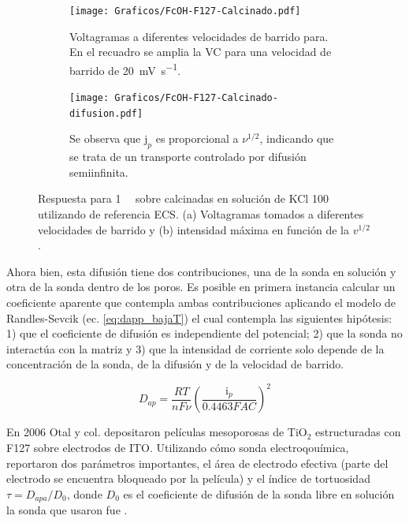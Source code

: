 	 	\begin{figure}[h!]
				 \begin{subfigure}[t]{0.5\textwidth}
		 	    \texttt{[image: Graficos/FcOH-F127-Calcinado.pdf]}
		        \caption[Voltagrama para \fc\space en \pdm\space calcinadas]{Voltagramas a diferentes velocidades de barrido para. En el recuadro se amplia la VC para una velocidad de barrido de \SI{20}{\milli\volt\per\second}.}
		        \label{fig:fc_calcinado}
		      	\end{subfigure}
		      	  \begin{subfigure}[t]{0.5\textwidth}
		 	    \texttt{[image: Graficos/FcOH-F127-Calcinado-difusion.pdf]}
		        \caption[i$_p$ en función de $\nu$ para \fc\space]{Se observa que $\text{j}_p$ es proporcional a $\nu ^{1/2}$, indicando que se trata de un transporte controlado por difusión semiinfinita.}
		        \label{fig:difusion_calcinado}
		      	\end{subfigure}
		      	\caption{Respuesta para \fc\space \SI{1}{\milli\Molar} sobre \pdmF\space calcinadas en solución de KCl \SI{100}{\milli\Molar} utilizando de referencia ECS. (a) Voltagramas tomados a diferentes velocidades de barrido y (b) intensidad máxima en función de la $v^{1/2}$.}
		      	\end{figure}

	 Ahora bien, esta difusión tiene dos contribuciones, una de la sonda en solución y otra de la sonda dentro de los poros. Es posible en primera instancia calcular un coeficiente aparente que contempla ambas contribuciones aplicando el modelo de Randles-Sevcik (ec. \ref{eq:dapp_bajaT}) el cual contempla las siguientes hipótesis: 1) que el coeficiente de difusión es independiente del potencial; 2) que la sonda no interactúa con la matriz y 3) que la intensidad de corriente solo depende de la concentración de la sonda, de la difusión y de la velocidad de 	barrido.  	

	 	 \begin{equation}
					D_{ap}=\frac{RT}{nF\nu}\left(\frac{\text{i}_p}{0.4463FAC}\right)^2
					\label{eq:dapp_bajaT}
			\end{equation}  

	 En 2006 Otal y col. \cite{Otal2006} depositaron películas mesoporosas de TiO$_2$ estructuradas con F127 sobre electrodos de ITO. Utilizando \fe\space cómo sonda electroqouímica, reportaron dos parámetros importantes, el área de electrodo efectiva (parte del electrodo se encuentra bloqueado por la película) y el índice de tortuosidad $\tau=D_{apa}/D_0$, donde $D_0$ es el coeficiente de difusión de la sonda libre en solución la sonda que usaron fue \fe. 
	 
